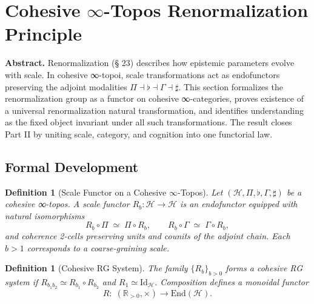 \documentclass[12pt,a4paper,twoside,openright]{book}
\newtheorem{definition}[theorem]{Definition}
\begin{document}

\section{Cohesive \texorpdfstring{$\infty$}{∞}-Topos Renormalization Principle}
\label{sec:cohesiverg}

\textbf{Abstract.}
Renormalization (§ 23) describes how epistemic parameters evolve with scale.
In cohesive ∞-topoi, scale transformations act as endofunctors preserving the adjoint modalities
\(\Pi\dashv\flat\dashv\Gamma\dashv\sharp\).
This section formalizes the renormalization group as a functor on cohesive ∞-categories,
proves existence of a universal renormalization natural transformation,
and identifies understanding as the fixed object invariant under all such transformations.
The result closes Part II by uniting scale, category, and cognition into one functorial law.

\subsection*{Formal Development}

\begin{definition}[Scale Functor on a Cohesive \texorpdfstring{$\infty$}{∞}-Topos]
Let \((\mathcal{H},\Pi,\flat,\Gamma,\sharp)\) be a cohesive ∞-topos.
A \emph{scale functor} \(R_b:\mathcal{H}\to\mathcal{H}\) is an endofunctor equipped with natural isomorphisms
\[
R_b\circ\Pi \;\simeq\; \Pi\circ R_b,\qquad
R_b\circ\Gamma \;\simeq\; \Gamma\circ R_b,
\]
and coherence 2-cells preserving units and counits of the adjoint chain.
Each \(b>1\) corresponds to a coarse-graining scale.
\end{definition}

\begin{definition}[Cohesive RG System]
The family \(\{R_b\}_{b>0}\) forms a \emph{cohesive RG system} if  
\(R_{b_1b_2}\simeq R_{b_1}\!\circ\!R_{b_2}\) and \(R_1\simeq\mathrm{Id}_\mathcal{H}\).
Composition defines a monoidal functor
\[
R:\;(\mathbb{R}_{>0},\times)\longrightarrow\mathrm{End}(\mathcal{H}).
\]
\end{definition}
\end{document}
